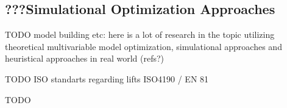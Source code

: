 \subsection{???Simulational Optimization Approaches}
TODO
model building etc: here is a lot of research in the topic utilizing theoretical multivariable model optimization, simulational approaches and heuristical approaches in real world (refs?)

TODO
ISO standarts regarding lifts ISO4190 / EN 81

TODO

